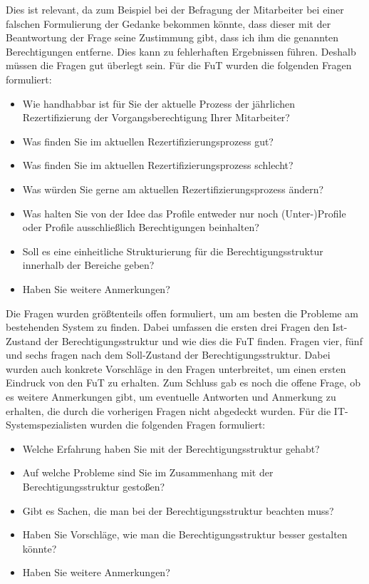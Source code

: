 \newline
Dies ist relevant, da zum Beispiel bei der Befragung der Mitarbeiter bei einer falschen Formulierung der Gedanke bekommen könnte, dass dieser mit der Beantwortung der Frage seine Zustimmung gibt, dass ich ihm die genannten Berechtigungen entferne.
Dies kann zu fehlerhaften Ergebnissen führen.
Deshalb müssen die Fragen gut überlegt sein.
\newline
\newline
Für die \ac{FuT} wurden die folgenden Fragen formuliert: 
\begin{itemize}
	\item Wie handhabbar ist für Sie der aktuelle Prozess der jährlichen Rezertifizierung der Vorgangsberechtigung Ihrer Mitarbeiter?
	\item Was finden Sie im aktuellen Rezertifizierungsprozess gut?
	\item Was finden Sie im aktuellen Rezertifizierungsprozess schlecht?
	\item Was würden Sie gerne am aktuellen Rezertifizierungsprozess ändern?
	\item Was halten Sie von der Idee das Profile entweder nur noch (Unter-)Profile oder Profile ausschließlich Berechtigungen beinhalten?
	\item Soll es eine einheitliche Strukturierung für die Berechtigungsstruktur innerhalb der Bereiche geben?
	\item Haben Sie weitere Anmerkungen?
\end{itemize}
Die Fragen wurden größtenteils offen formuliert, um am besten die Probleme am bestehenden System zu finden.
Dabei umfassen die ersten drei Fragen den Ist-Zustand der Berechtigungsstruktur und wie dies die \ac{FuT} finden.
Fragen vier, fünf und sechs fragen nach dem Soll-Zustand der Berechtigungsstruktur.
Dabei wurden auch konkrete Vorschläge in den Fragen unterbreitet, um einen ersten Eindruck von den \ac{FuT} zu erhalten.
Zum Schluss gab es noch die offene Frage, ob es weitere Anmerkungen gibt, um eventuelle Antworten und Anmerkung zu erhalten, die durch die vorherigen Fragen nicht abgedeckt wurden.
\newline
\newline
Für die IT-Systemspezialisten wurden die folgenden Fragen formuliert: 
\begin{itemize}
	\item Welche Erfahrung haben Sie mit der Berechtigungsstruktur gehabt?
	\item Auf welche Probleme sind Sie im Zusammenhang mit der Berechtigungsstruktur gestoßen?
	\item Gibt es Sachen, die man bei der Berechtigungsstruktur beachten muss?
	\item Haben Sie Vorschläge, wie man die Berechtigungsstruktur besser gestalten könnte?
	\item Haben Sie weitere Anmerkungen?
\end{itemize}
